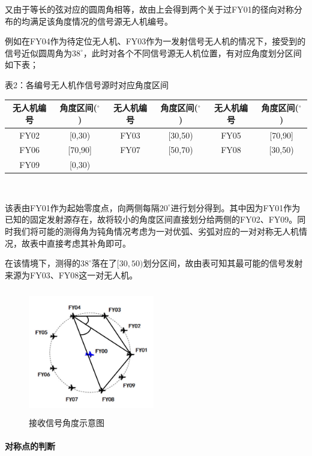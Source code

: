 \documentclass{ctexart}
\newcommand{\subsubsubsection}[1]{\paragraph{#1}\mbox{}\\}
\begin{document}
又由于等长的弦对应的圆周角相等，故由上会得到两个关于过FY01的径向对称分布的均满足该角度情况的信号源无人机编号。

例如在FY04作为待定位无人机、FY03作为一发射信号无人机的情况下，接受到的信号近似圆周角为$38^{\circ}$，此时对各个不同信号源无人机位置，有对应角度划分区间如下表；

\begin{center}
  表2：各编号无人机作信号源时对应角度区间
  ~\\
    \begin{tabular}{|c|c|c|c|c|c|}
        \hline
        无人机编号&角度区间($^{\circ}$)&无人机编号&角度区间($^{\circ}$)&无人机编号&角度区间($^{\circ}$)\\
        \hline
        FY02&[0,30)&FY03&[30,50)&FY05&[70,90]\\
        \hline
        FY06&[70,90]&FY07&[50,70)&FY08&[30,50)\\
        \hline
        FY09&[0,30)& & & &\\    
        \hline
    \end{tabular}\\
\end{center}

该表由FY01作为起始零度点，向两侧每隔$20^{\circ}$进行划分得到。其中因为FY01作为已知的固定发射源存在，故将较小的角度区间直接划分给两侧的FY02、FY09。同时我们将可能的测得角为钝角情况考虑为一对优弧、劣弧对应的一对对称无人机情况，故表中直接考虑其补角即可。

在该情境下，测得的$38^{\circ}$落在了$[30,50)$划分区间，故由表可知其最可能的信号发射来源为FY03、FY08这一对无人机。

\begin{figure}[H]
  \centering
  \includegraphics[height=5.5cm,width=5.5cm]{pic/example_for_2.a.jpg}
  \caption{接收信号角度示意图}
  \end{figure}



\subsubsubsection{对称点的判断}
\end{document}
